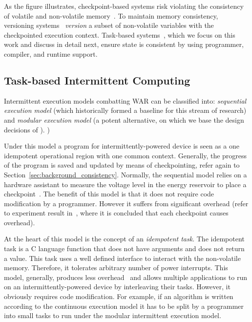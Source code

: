 As the figure illustrates, checkpoint-based systems risk violating the
consistency of volatile and non-volatile memory~\cite{dino}. To maintain memory
consistency, versioning systems~\cite{dino,ratchet} {\em version} a subset of
non-volatile variables with the checkpointed execution context. Task-based
systems~\cite{chain,alpaca}, which we focus on this work and discuss in detail
next, ensure state is consistent by using programmer, compiler, and runtime
support.


\subsection{Task-based Intermittent Computing}
Intermittent execution models combatting WAR can be classified into: \emph{sequential execution model} (which historically formed a baseline for this stream of research) and \emph{modular execution model} (a potent alternative, on which we base the design decisions of \sys).
)

Under this model a program for intermittently-powered device is seen as a one idempotent operational region with one common context. Generally, the progress of the program is saved and updated by means of checkpointing, refer again to Section~\ref{sec:background_consistency}. Normally, the sequential model relies on a hardware assistant to measure the voltage level in the energy reservoir to place a checkpoint~\cite{mementos,mottola2017harvos,hibernus}. The benefit of this model is that it does not require code modification by a programmer. However it suffers from significant overhead (refer to experiment result in~\cite[Fig. 3]{chain}, where it is concluded that each checkpoint causes overhead). 


At the heart of this model is the concept of an \emph{idempotent task}. The idempotent task is a C language function that does not have arguments and does not return a value. This task uses a well defined interface to interact with the non-volatile memory. Therefore, it tolerates arbitrary number of power interrupts. This model, generally, produces less overhead~\cite{chain} and allows multiple applications to run on an intermittently-powered device by interleaving their tasks. However, it obviously requires code modification. For example, if an algorithm is written according to the continuous execution model it has to be split by a programmer into small tasks to run under the modular intermittent execution model.

